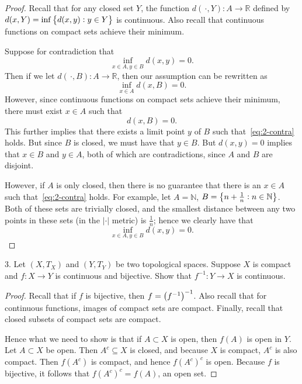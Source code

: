 \documentclass{article}
\newcommand{\N}{\mathbb{N}}
\newcommand{\R}{\mathbb{R}}
\begin{document}
\begin{proof}

Recall that for any closed set $Y$, the function $d(\, \cdot, Y): A \to
\R$ defined by $d(x, Y) = \inf \cbr{d(x, y): y \in Y}$ is continuous.
Also recall that continuous functions on compact sets achieve their
minimum.

Suppose for contradiction that
%
\begin{equation*}
    \inf_{x \in A, y \in B} d(x, y) = 0
    .
\end{equation*}
%
Then if we let $d(\, \cdot, B): A \to \R$, then our assumption can be
rewritten as
%
\begin{equation*}
    \inf_{x \in A} d(x, B) = 0
    .
\end{equation*}
%
However, since continuous functions on compact sets achieve their
minimum, there must exist $x \in A$ such that
%
\begin{equation}
    d(x, B) = 0
    \label{eq:2-contra}
    .
\end{equation}
%
This further implies that there exists a limit point $y$ of $B$ such
that~\eqref{eq:2-contra} holds. But since $B$ is closed, we must have
that $y \in B$. But $d(x, y) = 0$ implies that $x \in B$ and $y \in A$,
both of which are contradictions, since $A$ and $B$ are disjoint.

However, if $A$ is only closed, then there is no guarantee that there is
an $x \in A$ such that~\eqref{eq:2-contra} holds. For example, let $A =
\N$, $B = \cbr{n + \frac{1}{n}: n \in \N}$. Both of these sets are
trivially closed, and the smallest distance between any two points in
these sets (in the $|\cdot|$ metric) is $\frac{1}{n}$; hence we clearly
have that
%
\begin{equation*}
    \inf_{x \in A, y \in B} d(x, y) = 0
    .
\end{equation*}

\end{proof}

\newpage

3. Let $(X, T_X)$ and $(Y, T_Y)$ be two topological spaces. Suppose $X$
   is compact and $f: X \to Y$ is continuous and bijective. Show that
   $f^{-1}: Y \to X$ is continuous.

\begin{proof}

Recall that if $f$ is bijective, then $f = \del{f^{-1}}^{-1}$. Also
recall that for continuous functions, images of compact sets are
compact. Finally, recall that closed subsets of compact sets are compact.

Hence what we need to show is that if $A \subset X$ is open, then $f(A)$
is open in $Y$. Let $A \subset X$ be open. Then $A^c \subseteq X$ is
closed, and because $X$ is compact, $A^c$ is also compact. Then $f(A^c)$
is compact, and hence $f(A^c)^c$ is open. Because $f$ is bijective, it
follows that $f(A^c)^c = f(A)$, an open set.

\end{proof}
\end{document}
